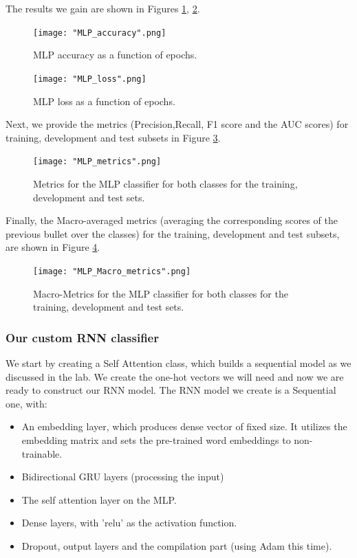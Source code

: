 \documentclass[10pt, a4paper]{article}
\begin{document}
	The results we gain are shown in Figures \ref{fig::mlp_accuracy}, \ref{fig::mlp_loss}.
	
	\begin{figure}
		\centering
		\texttt{[image: "MLP\_accuracy".png]}
		\caption{MLP accuracy as a function of epochs.}
		\label{fig::mlp_accuracy}
	\end{figure}
	
	\begin{figure}
		\centering
		\texttt{[image: "MLP\_loss".png]}
		\caption{MLP loss as a function of epochs.}
		\label{fig::mlp_loss}
	\end{figure}
	
	Next, we provide the metrics (Precision,Recall, F1 score and the AUC scores) for training, development and test subsets in Figure \ref{fig::mlp_metrics}.
	
	\begin{figure}
		\centering
		\texttt{[image: "MLP\_metrics".png]}
		\caption{Metrics for the MLP classifier for both classes for the training, development and test sets.}
		\label{fig::mlp_metrics}
	\end{figure}
	
	Finally,  the Macro-averaged metrics (averaging the corresponding scores of the previous bullet over the classes) for the training, development and test subsets, are shown in Figure \ref{fig::mlp_macro_metrics}.
	
	\begin{figure}
		\centering
		\texttt{[image: "MLP\_Macro\_metrics".png]}
		\caption{Macro-Metrics for the MLP classifier for both classes for the training, development and test sets.}
		\label{fig::mlp_macro_metrics}
	\end{figure}
	
	\subsubsection{Our custom RNN classifier}
	We start by creating a Self Attention class, which builds a sequential model as we discussed in the lab. We create the one-hot vectors we will need and now we are ready to construct our RNN model. The RNN model we create is a Sequential one, with:
    \begin{itemize}
        \item An embedding layer, which produces dense vector of fixed size. It utilizes the embedding matrix and sets the pre-trained word embeddings to non-trainable.
        \item Bidirectional GRU layers (processing the input)
        \item The self attention layer on the MLP.
        \item Dense layers, with 'relu' as the activation function.
        \item Dropout, output layers and the compilation part (using Adam this time).
    \end{itemize}
\end{document}
